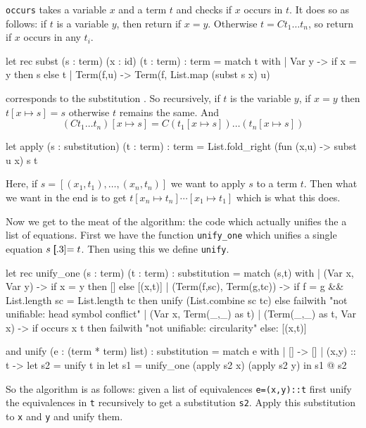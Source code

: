 {\tt occurs} takes a variable $x$ and a term $t$ and checks if $x$ occurs in $t$. 
It does so as follows: if $t$ is a variable $y$, then return if $x=y$.
Otherwise $t=Ct_1\dots t_n$, so return if $x$ occurs in any $t_i$.

\beginhi \color{white} \globcounttrue
let rec subst (s : term) (x : id) (t : term) : term =
    match t with
    | Var y -> if x = y then s else t
    | Term(f,u) -> Term(f, List.map (subst s x) u)
\endhi

 corresponds to the substitution .
So recursively, if $t$ is the variable $y$, if $x=y$ then $t[x\mapsto s]=s$ otherwise $t$ remains the same.
And
$$ (Ct_1\dots t_n)[x\mapsto s] = C(t_1[x\mapsto s])\dots(t_n[x\mapsto s]) $$

\beginhi \color{white} \globcounttrue
let apply (s : substitution) (t : term) : term =
    List.fold_right (fun (x,u) -> subst u x) s t
\endhi

Here, if $s=[(x_1,t_1),\dots,(x_n,t_n)]$ we want to apply $s$ to a term $t$.
Then what we want in the end is to get $t[x_n\mapsto t_n]\cdots[x_1\mapsto t_1]$ which is what this does.

Now we get to the meat of the algorithm: the code which actually unifies the a list of equations.
First we have the function {\tt unify\_one} which unifies a single equation $s\eq t$.
Then using this we define {\tt unify}.

\beginhi \color{white} \globcounttrue
let rec unify_one (s : term) (t : term) : substitution =
    match (s,t) with
    | (Var x, Var y) -> if x = y then [] else [(x,t)]
    | (Term(f,sc), Term(g,tc)) ->
        if f = g && List.length sc = List.length tc
        then unify (List.combine sc tc)
        else failwith "not unifiable: head symbol conflict"
    | (Var x, Term(_,_) as t) | (Term(_,_) as t, Var x) ->
        if occurs x t
        then failwith "not unifiable: circularity"
        else: [(x,t)]

and unify (e : (term * term) list) : substitution =
    match e with
    | [] -> []
    | (x,y) :: t ->
        let s2 = unify t in
        let s1 = unify_one (apply s2 x) (apply s2 y) in
        s1 @ s2
\endhi

So the algorithm is as follows: given a list of equivalences {\tt e=(x,y)::t} first unify the equivalences in {\tt t} recursively to get a substitution {\tt s2}.
Apply this substitution to {\tt x} and {\tt y} and unify them.

